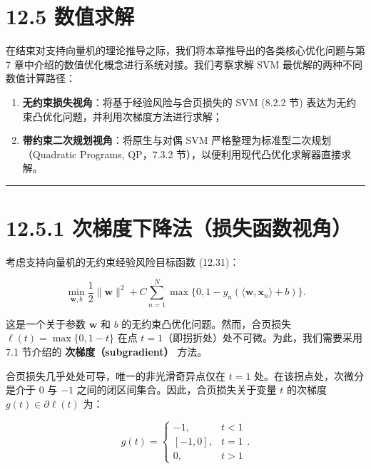 \section*{12.5 数值求解}
\label{sec:12.5}

在结束对支持向量机的理论推导之际，我们将本章推导出的各类核心优化问题与第 7 章中介绍的数值优化概念进行系统对接。我们考察求解 SVM 最优解的两种不同数值计算路径：

\begin{enumerate}
\item \textbf{无约束损失视角}：将基于经验风险与合页损失的 SVM (8.2.2 节) 表达为无约束凸优化问题，并利用次梯度方法进行求解；
\item \textbf{带约束二次规划视角}：将原生与对偶 SVM 严格整理为标准型二次规划（Quadratic Programs, QP，7.3.2 节），以便利用现代凸优化求解器直接求解。
\end{enumerate}

\medskip\hrule\medskip

\section*{12.5.1 次梯度下降法（损失函数视角）}

考虑支持向量机的无约束经验风险目标函数 (12.31)：

\begin{equation*}
\min_{\boldsymbol{w}, b} \frac{1}{2} \|\boldsymbol{w}\|^2 + C \sum_{n=1}^N \max\{0, 1 - y_n (\langle \boldsymbol{w}, \boldsymbol{x}_n \rangle + b)\} .
\end{equation*}

这是一个关于参数 $ \boldsymbol{w} $ 和 $ b $ 的无约束凸优化问题。然而，合页损失 $ \ell(t) = \max\{0, 1 - t\} $ 在点 $ t = 1 $（即拐折处）处不可微。为此，我们需要采用 7.1 节介绍的 \textbf{次梯度（subgradient）} 方法。

合页损失几乎处处可导，唯一的非光滑奇异点仅在 $ t = 1 $ 处。在该拐点处，次微分是介于 $ 0 $ 与 $ -1 $ 之间的闭区间集合。因此，合页损失关于变量 $ t $ 的次梯度 $ g(t) \in \partial \ell(t) $ 为：

\begin{equation}
g(t) = \begin{cases} -1, & t < 1 \\ [-1, 0], & t = 1 \\ 0, & t > 1 \end{cases} .
\tag{12.54}
\end{equation}

